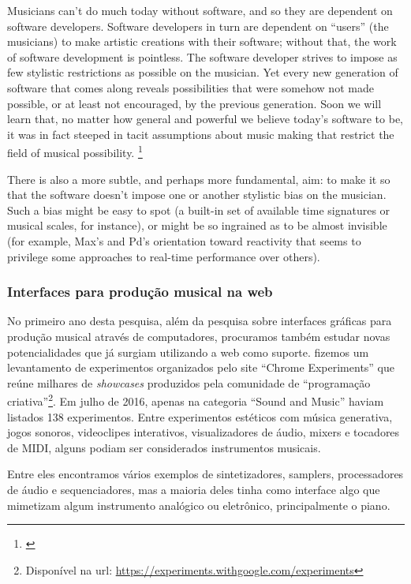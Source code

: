 \begin{citacao}
Musicians can’t do much today without software, and so they are dependent on software developers. Software developers in turn are dependent on “users” (the musicians) to make artistic creations with their software; without that, the work of software development is pointless. The software developer strives to impose as few stylistic restrictions as possible on the musician. Yet every new generation of software that comes along reveals possibilities that were somehow not made possible, or at least not encouraged, by the previous generation. Soon we will learn that, no matter how general and powerful we believe today’s software to be, it was in fact steeped in tacit assumptions about music making that restrict the field of musical possibility. \footnote{\cite{PucketteMiller}}
\end{citacao}

\begin{citacao}
There is also a more subtle, and perhaps more fundamental, aim: to make it so that the software doesn’t impose one or another stylistic bias on the musician. Such a bias might be easy to spot (a built-in set of available time signatures or musical scales, for instance), or might be so ingrained as to be almost invisible (for example, Max’s and Pd’s orientation toward reactivity that seems to privilege some approaches to real-time performance over others).
\end{citacao}

\subsubsection{Interfaces para produção musical na web}
No primeiro ano desta pesquisa, além da pesquisa sobre interfaces gráficas para produção musical através de computadores, procuramos também estudar novas potencialidades que já surgiam utilizando a web como suporte.  fizemos um levantamento de experimentos organizados pelo site ``Chrome Experiments'' que reúne milhares de \emph{showcases} produzidos pela comunidade de ``programação criativa''\footnote{Disponível na url: \url{https://experiments.withgoogle.com/experiments}}. Em julho de 2016, apenas na categoria ``Sound and Music''  haviam listados 138 experimentos. Entre experimentos estéticos com música generativa, jogos sonoros, videoclipes interativos, visualizadores de áudio, mixers e tocadores de MIDI, alguns podiam ser considerados instrumentos musicais. 

Entre eles encontramos vários exemplos de sintetizadores, samplers, processadores de áudio e sequenciadores, mas a maioria deles tinha como interface algo que mimetizam algum instrumento analógico ou eletrônico, principalmente o piano.


